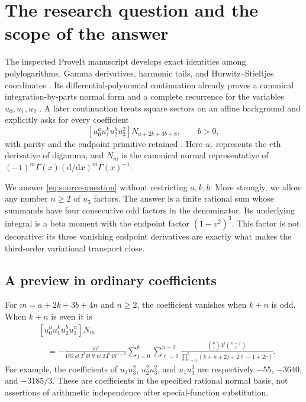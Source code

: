 \documentclass[11pt]{article}
\numberwithin{equation}{section}
\theoremstyle{definition}\newtheorem{definition}[theorem]{Definition}
\theoremstyle{remark}\newtheorem{remark}[theorem]{Remark}
\begin{document}
\section{The research question and the scope of the answer}
\label{sec:scope}

The inspected ProveIt manuscript develops exact identities among
polylogarithms, Gamma derivatives, harmonic tails, and Hurwitz--Stieltjes
coordinates \cite{RepoMain}. Its differential-polynomial continuation
already proves a canonical integration-by-parts normal form and a complete
recurrence for the variables $u_0,u_1,u_2$ \cite{RepoQuadratic}. A later
continuation treats square sectors on an affine background and explicitly
asks for every coefficient
\begin{equation}\label{eq:source-question}
 [u_0^a u_1^k u_2^b u_3^2]N_{a+2k+3b+8},\qquad b>0,
\end{equation}
with parity and the endpoint primitive retained \cite[Question 1]{RepoQuestions}.
Here $u_r$ represents the $r$th derivative of digamma, and $N_m$ is the
canonical normal representative of
$(-1)^m\Gamma(x)(\mathrm d/\mathrm dx)^m\Gamma(x)^{-1}$.

We answer \eqref{eq:source-question} without restricting $a,k,b$. More
strongly, we allow any number $n\ge2$ of $u_3$ factors. The answer is a
finite rational sum whose summands have four consecutive odd factors in
the denominator. Its underlying integral is a beta moment with the
endpoint factor $(1-v^2)^3$. This factor is not decorative: its three
vanishing endpoint derivatives are exactly what makes the third-order
variational transport close.

\subsection{A preview in ordinary coefficients}
For $m=a+2k+3b+4n$ and $n\ge2$, the coefficient vanishes when $k+n$ is
odd. When $k+n$ is even it is
\begin{equation}\label{eq:preview}
\begin{split}
 &[u_0^a u_1^k u_2^b u_3^n]N_m\\
 &\quad=-\frac{m!}{192\,a!\,2^k k!\,b!\,n!\,24^b48^{n-2}}
 \sum_{j=0}^{b}\sum_{\ell=0}^{n-2}
 \frac{\binom bj3^j\binom{n-2}{\ell}}
 {\displaystyle\prod_{r=0}^{3}(k+n+2j+2\ell-1+2r)}.
\end{split}
\end{equation}
For example, the coefficients of $u_2u_3^2$, $u_2^2u_3^2$, and
$u_1u_3^3$ are respectively $-55$, $-3640$, and $-3185/3$. These are
coefficients in the specified rational normal basis, not assertions of
arithmetic independence after special-function substitution.
\end{document}
